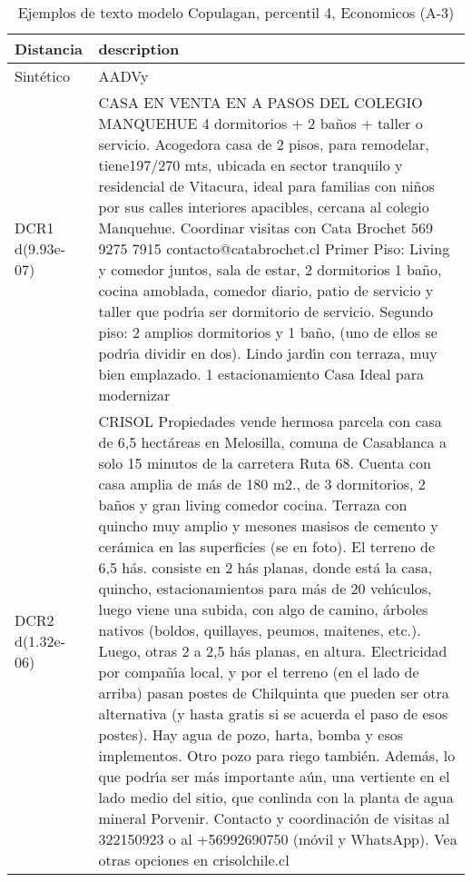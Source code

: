\begin{table}[H]
\centering
\fontsize{10}{14}\selectfont
\caption{Ejemplos de texto modelo Copulagan, percentil 4, Economicos (A-3)}
\label{table-example-economicos-a-3-copulagan-4p-text}
\begin{tabular}{|l|m{35em}|}
\hline
\rowcolor[gray]{0.8}
Distancia & description \\
\hline Sintético & AADVy \\
\hline DCR1 d(9.93e-07) & CASA EN VENTA EN A PASOS DEL COLEGIO MANQUEHUE 4 dormitorios + 2 ba\~nos + taller o servicio.   Acogedora casa de 2 pisos, para remodelar, tiene197/270 mts, ubicada en sector tranquilo y residencial de Vitacura, ideal para familias con ni\~nos por sus calles interiores apacibles, cercana al colegio Manquehue.  Coordinar visitas con Cata Brochet 569 9275 7915 contacto@catabrochet.cl  Primer Piso: Living y comedor juntos, sala de estar, 2 dormitorios 1 ba\~no, cocina amoblada, comedor diario, patio de servicio y taller que podr{\'\i}a ser dormitorio de servicio.  Segundo piso:  2 amplios dormitorios y 1 ba\~no, (uno de ellos se podr{\'\i}a dividir en dos).  Lindo jard{\'\i}n con terraza, muy bien emplazado.  1 estacionamiento Casa Ideal para modernizar \\
\hline DCR2 d(1.32e-06) & CRISOL Propiedades vende hermosa parcela con casa de 6,5 hect\'areas en Melosilla, comuna de Casablanca a solo 15 minutos de la carretera Ruta 68. Cuenta con casa amplia de m\'as de 180 m2., de 3 dormitorios, 2 ba\~nos y gran living comedor cocina. Terraza con quincho muy amplio y mesones masisos de cemento y cer\'amica en las superficies (se en foto). El terreno de 6,5 h\'as. consiste en 2 h\'as planas, donde est\'a la casa, quincho, estacionamientos para m\'as de 20 veh{\'\i}culos, luego viene una subida, con algo de camino, \'arboles nativos (boldos, quillayes, peumos, maitenes, etc.). Luego, otras 2 a 2,5 h\'as planas, en altura. Electricidad por compa\~n{\'\i}a local, y por el terreno (en el lado de arriba) pasan postes de Chilquinta que pueden ser otra alternativa (y hasta gratis si se acuerda el paso de esos postes). Hay agua de pozo, harta, bomba y esos implementos. Otro pozo para riego tambi\'en. Adem\'as, lo que podr{\'\i}a ser m\'as importante a\'un, una vertiente en el lado medio del sitio, que conlinda con la planta de agua mineral Porvenir. Contacto y coordinaci\'on de visitas al 322150923 o al +56992690750 (m\'ovil y WhatsApp). Vea otras opciones en crisolchile.cl \\
\hline
\end{tabular}
\end{table}
